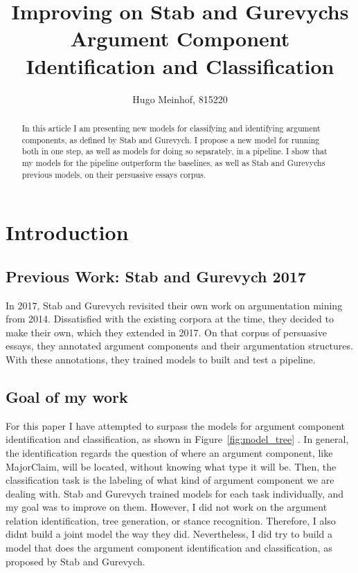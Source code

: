 \documentclass[12]{article}
\title{Improving on Stab and Gurevychs Argument Component Identification and Classification}
\author{Hugo Meinhof, 815220}
\theoremstyle{mytheoremstyle}
\theoremstyle{mytheoremstyle}
\theoremstyle{myproblemstyle}
\begin{document}
  \maketitle
  \begin{abstract}
  In this article I am presenting new models for classifying and identifying argument components, as defined by Stab and Gurevych\cite{stab-gurevych-2017-parsing}. I propose a new model for running both in one step, as well as models for doing so separately, in a pipeline. I show that my models for the pipeline outperform the baselines, as well as Stab and Gurevychs previous models, on their persuasive essays corpus.
  \end{abstract}
  \section{Introduction\dotfill}
  \subsection{Previous Work: Stab and Gurevych 2017}
  In 2017, Stab and Gurevych\cite{stab-gurevych-2017-parsing} revisited their own work on argumentation mining from 2014. Dissatisfied with the existing corpora at the time, they decided to make their own, which they extended in 2017. On that corpus of persuasive essays, they annotated argument components and their argumentation structures. With these annotations, they trained models to built and test a pipeline. 
  \subsection{Goal of my work}
  For this paper I have attempted to surpass the models for argument component identification and classification, as shown in Figure~\ref{fig:model_tree} \cite{stab-gurevych-2017-parsing}. 
  In general, the identification regards the question of where an argument component, like MajorClaim, will be located, without knowing what type it will be. 
  Then, the classification task is the labeling of what kind of argument component we are dealing with. 
  Stab and Gurevych trained models for each task individually, and my goal was to improve on them. 
  However, I did not work on the argument relation identification, tree generation, or stance recognition. 
  Therefore, I also didnt build a joint model the way they did.
  Nevertheless, I did try to build a model that does the argument component identification and classification, as proposed by Stab and Gurevych.
\end{document}
